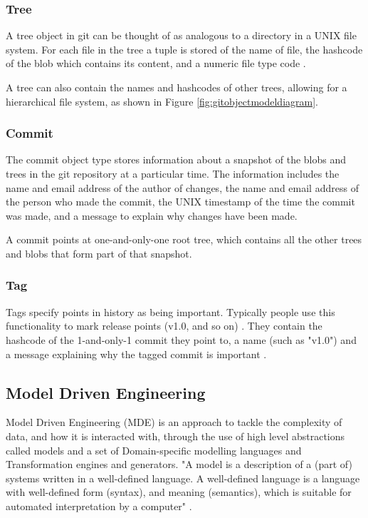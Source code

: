 \documentclass[runningheads,a4paper]{llncs}
\begin{document}
\subsubsection{Tree}
A tree object in git can be thought of as analogous to a directory in a UNIX file system. For each file in the tree a tuple is stored of the name of file, the hashcode of the blob which contains its content, and a numeric file type code \cite{gitmagic}.

A tree can also contain the names and hashcodes of other trees, allowing for a hierarchical file system, as shown in Figure \ref{fig:gitobjectmodeldiagram}. 

\subsubsection{Commit}
The commit object type stores information about a snapshot of the blobs and trees in the git repository at a particular time. The information includes the name and email address of the author of changes, the name and email address of the person who made the commit, the UNIX timestamp of the time the commit was made, and a message to explain why changes have been made.

A commit points at one-and-only-one root tree, which contains all the other trees and blobs that form part of that snapshot.

\subsubsection{Tag}
Tags specify points in history as being important. Typically people use this functionality to mark release points (v1.0, and so on) \cite{gitdocstags}. They contain the hashcode of the 1-and-only-1 commit they point to, a name (such as "v1.0") and a message explaining why the tagged commit is important \cite{gitforcomputerscientists}.

\subsection{Model Driven Engineering}
Model Driven Engineering (MDE) is an approach to tackle the complexity of data, and how it is interacted with, through the use of high level abstractions called models \cite{modeldrivenengineering} and a set of Domain-specific modelling languages and Transformation engines and generators. "A model is a description of a (part of) systems written in a well-defined language. A well-defined language is a language with well-defined form (syntax), and meaning (semantics), which is suitable for automated interpretation by a computer" \cite{mdaexplained}.
\end{document}
